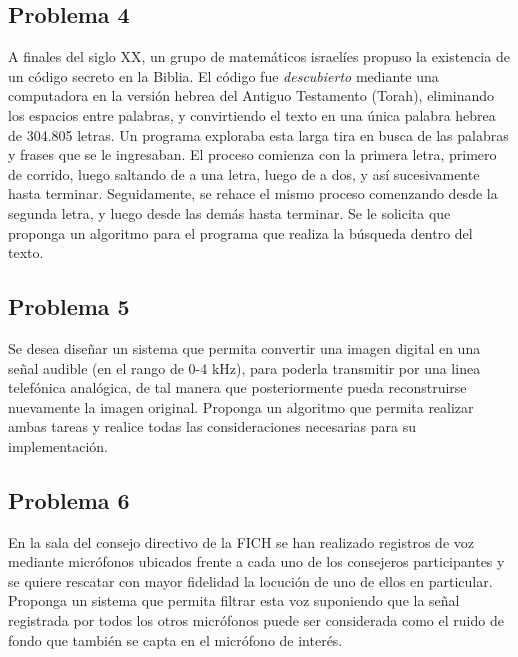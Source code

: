 \documentclass[a4paper,10pt,spanish,oneside]{article}
\begin{document}
\subsection{Problema 4}
A finales del siglo XX, un grupo de matemáticos israelíes propuso la existencia de un código secreto en la Biblia. El código fue \textit{descubierto} mediante una computadora en la versión hebrea del Antiguo Testamento (Torah), eliminando los espacios entre palabras, y convirtiendo el texto en una única palabra hebrea de 304.805 letras. Un programa exploraba esta larga tira en busca de las palabras y frases que se le ingresaban. El proceso comienza con la primera letra, primero de corrido, luego saltando de a una letra, luego de a dos, y así sucesivamente hasta
terminar. Seguidamente, se rehace el mismo proceso comenzando desde la segunda letra, y luego desde las demás hasta terminar. Se le solicita que proponga un algoritmo para el programa que realiza la búsqueda dentro del texto.

\subsection{Problema 5}
Se desea diseñar un sistema que permita convertir una imagen digital en una señal audible (en el rango de 0-4 kHz), para poderla transmitir por una linea telefónica analógica, de tal manera que posteriormente pueda reconstruirse nuevamente la imagen original. Proponga un algoritmo que permita realizar ambas tareas y realice
todas las consideraciones necesarias para su implementación.

\subsection{Problema 6}
En la sala del consejo directivo de la FICH se han realizado registros de voz mediante micrófonos ubicados frente a cada uno de los consejeros participantes y se quiere rescatar con mayor fidelidad la locución de uno de ellos en particular. Proponga un sistema que permita filtrar esta voz suponiendo que la señal registrada por todos los otros micrófonos puede ser considerada como el ruido de fondo que también se capta en el micrófono de interés.
\end{document}
